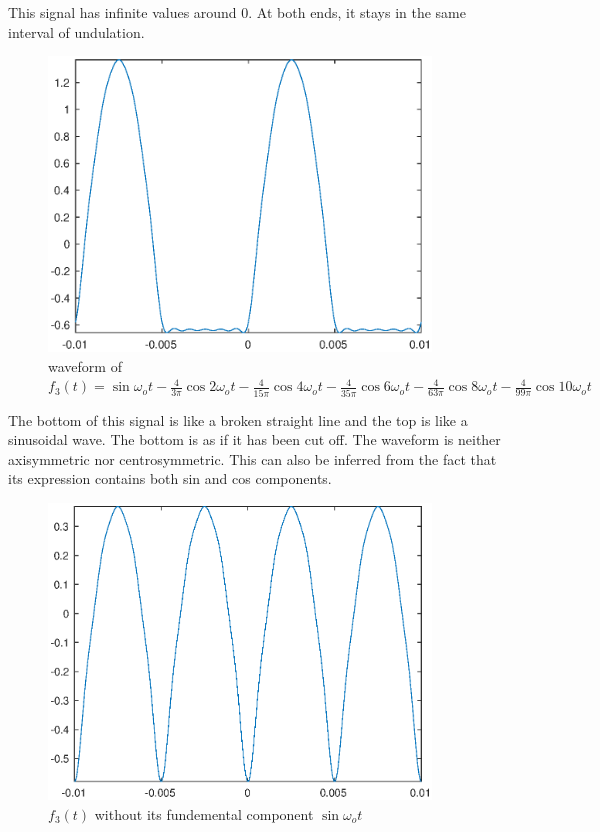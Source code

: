 This signal has infinite values around 0. At both ends, it stays in the same interval of undulation.



\begin{figure}[htbp]
  \centering
  \includegraphics [width=4in]{matlab/fig/C_r_c.eps}
  \caption{waveform of $f_3(t)=\sin\omega_o t - \frac{4}{3\pi}\cos2\omega_o t - \frac{4}{15\pi}\cos4\omega_o t - \frac{4}{35\pi}\cos6\omega_o t - \frac{4}{63\pi}\cos8\omega_o t - \frac{4}{99\pi}\cos10\omega_o t$}    
  \label{fig:C_r_c}
\end{figure}

The bottom of this signal is like a broken straight line and the top is like a sinusoidal wave. The bottom is as if it has been cut off. The waveform is neither axisymmetric nor centrosymmetric. This can also be inferred from the fact that its expression contains both sin and cos components.



\begin{figure}[htbp]
  \centering
  \includegraphics [width=4in]{matlab/fig/C_r_d.eps}
  \caption{$f_3(t)$ without its fundemental component $\sin\omega_o t$}    
  \label{fig:C_r_d}
\end{figure}

